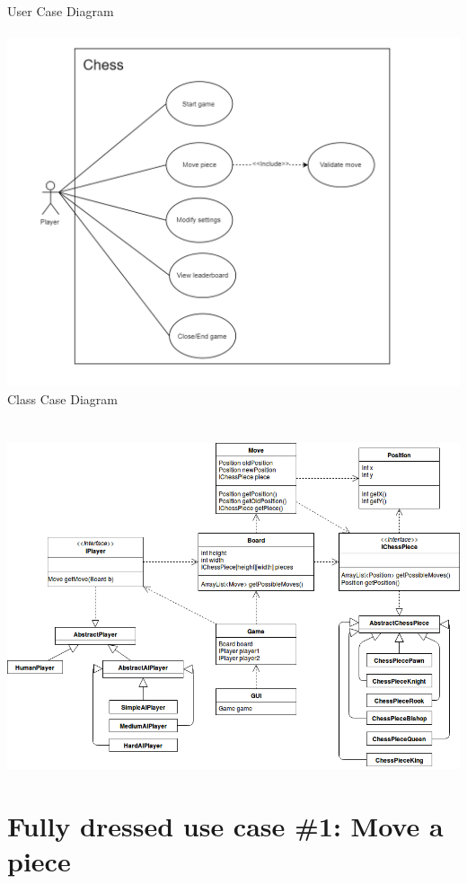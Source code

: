 \documentclass{article}
\begin{document}
\LARGE
\newpage
\hspace*{+2,5cm} 
User Case Diagram
\\\\
\hspace*{-2cm}  
\includegraphics[scale=0.60]{usecasediagram}
\newpage
\noindent
\hspace*{+2,5cm} 
Class Case Diagram
\\\\\\
\hspace*{-4,5cm}  
\includegraphics[scale=0.6]{classdiagram}

\normalsize
\newpage
\section{Fully dressed use case \#1: Move a piece}
\end{document}
